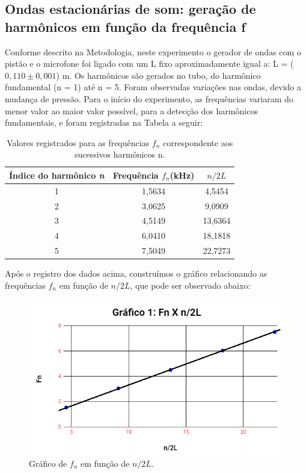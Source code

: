 \subsection{Ondas estacionárias de som: geração de harmônicos
em função da frequência f}

Conforme descrito na Metodologia, neste experimento o gerador de ondas com o pistão e o microfone foi ligado com um L fixo aproximadamente igual a: L = ($0,110 \pm 0,001$) m. Os harmônicos são gerados no tubo, do harmônico fundamental (n = 1) até n = 5. Foram observadas variações nas ondas, devido a mudança de pressão.  Para o início do experimento, as frequências variaram do menor valor ao maior valor possível, para a detecção dos harmônicos fundamentais, e foram registradas na Tabela a seguir:

\begin{table}[H]
    \centering
    \begin{tabular}{ |c||c||c|  }
        \hline
        \textbf{Índice do harmônico \textit{n}} & \textbf{Frequência \textit{$f_n$}(kHz)} & \textbf{$n/2L$}\\
        \hline 
         1&	1,5634&	4,5454	\\
         
         2&	3,0625&	9,0909 \\
         
         3&	4,5149&	13,6364 \\
         
         4&	6,0410&	18,1818 \\
         
         5&	7,5049&	22,7273 \\
        \hline
    \end{tabular}
    \caption{Valores registrados para as frequências $f_n$ correspondente aos sucessivos harmônicos n.} 
\end{table}

Após o registro dos dados acima, construímos o gráfico relacionando as frequências $f_n$ em função de $n/2L$, que pode ser observado abaixo:

\begin{figure}[H]
  \centering
  \includegraphics[scale=0.7]{images/gráfico 1.png}
  \caption{ Gráfico de $f_n$ em função de $n/2L$.}
\end{figure}

